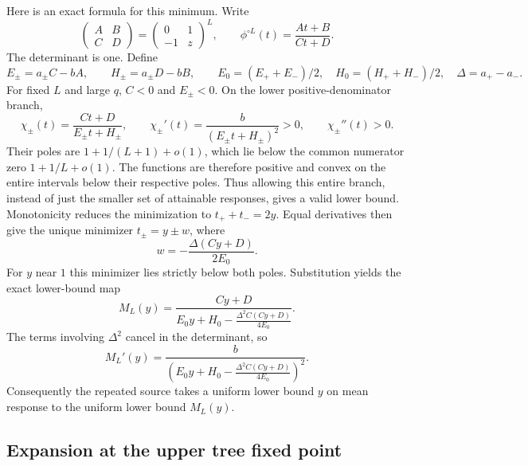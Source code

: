 \documentclass[11pt]{article}
\numberwithin{equation}{section}
\begin{document}
Here is an exact formula for this minimum. Write
\[
 \begin{pmatrix}A&B\\ C&D\end{pmatrix}
 =\begin{pmatrix}0&1\\-1&z\end{pmatrix}^{L},
 \qquad \phi^{\circ L}(t)=\frac{At+B}{Ct+D}.
\]
The determinant is one. Define
\[
 E_\pm=a_\pm C-bA,\qquad H_\pm=a_\pm D-bB,
 \qquad E_0=(E_++E_-)/2,\quad H_0=(H_++H_-)/2,
 \quad\Delta=a_+-a_-.
\]
For fixed $L$ and large $q$, $C<0$ and $E_\pm<0$. On the lower
positive-denominator branch,
\[
 \chi_\pm(t)=\frac{Ct+D}{E_\pm t+H_\pm},\qquad
 \chi_\pm'(t)=\frac b{(E_\pm t+H_\pm)^2}>0,
 \qquad \chi_\pm''(t)>0.
\]
Their poles are $1+1/(L+1)+o(1)$, which lie below the common
numerator zero $1+1/L+o(1)$. The functions are therefore positive
and convex on the entire intervals below their respective poles.
Thus allowing this entire branch, instead of just the smaller set
of attainable responses, gives a valid lower bound. Monotonicity
reduces the minimization to $t_++t_-=2y$. Equal derivatives then
give the unique minimizer $t_\pm=y\pm w$, where
\[
 w=-\frac{\Delta(Cy+D)}{2E_0}.
\]
For $y$ near $1$ this minimizer lies strictly below both poles.
Substitution yields the exact lower-bound map
\begin{equation}\label{eq:buffer-map}
 M_L(y)=
 \frac{Cy+D}
 {E_0y+H_0-\displaystyle\frac{\Delta^2 C(Cy+D)}{4E_0}}.
\end{equation}
The terms involving $\Delta^2$ cancel in the determinant, so
\begin{equation}\label{eq:buffer-map-derivative}
 M_L'(y)=
 \frac b
 {\left(E_0y+H_0-\displaystyle\frac{\Delta^2 C(Cy+D)}{4E_0}\right)^2}.
\end{equation}
Consequently the repeated source takes a uniform lower bound $y$
on mean response to the uniform lower bound $M_L(y)$.

\subsection*{Expansion at the upper tree fixed point}
\end{document}
